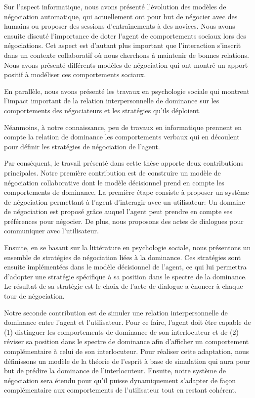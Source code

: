 			Sur l'aspect informatique, nous avons présenté l'évolution des modèles de négociation automatique, qui actuellement ont pour but de négocier avec des humains ou proposer des sessions d'entraînements à des novices. 			 
			Nous avons ensuite discuté l'importance de doter l'agent de comportements sociaux lors des négociations. Cet aspect est d'autant plus important que l'interaction s'inscrit dans un contexte collaboratif où nous cherchons à maintenir de bonnes relations. Nous avons présenté différents modèles de négociation qui ont montré un apport positif à modéliser ces comportements sociaux. 
			
			En parallèle, nous avons présenté les travaux en psychologie sociale qui montrent l'impact important de la relation interpersonnelle de dominance sur les comportements des négociateurs et les stratégies qu'ils déploient.
			
			Néanmoins, à notre connaissance, peu de travaux en informatique prennent en compte la relation de dominance les comportements verbaux qui en découlent pour définir les stratégies de négociation de l'agent.
			
			Par conséquent, le travail présenté dans cette thèse apporte deux contributions principales.
			Notre première contribution est de construire un modèle de négociation collaborative dont le modèle décisionnel prend en compte les comportements de dominance. 
			La première étape consiste à proposer un système de négociation permettant à l'agent d'interagir avec un utilisateur: Un domaine de négociation est proposé grâce auquel l'agent peut prendre en compte ses préférences pour négocier. De plus, nous proposons des actes de dialogues pour communiquer avec l'utilisateur.
			
			Ensuite, en se basant sur la littérature en psychologie sociale, nous présentons un ensemble de stratégies de négociation liées à la dominance.
			Ces stratégies sont ensuite implémentées dans le modèle décisionnel de l'agent, ce qui lui permettra d'adopter une stratégie spécifique à sa position dans le spectre de la dominance.  Le résultat de sa stratégie est le choix de l'acte de dialogue a énoncer à chaque tour de négociation.
			
			Notre seconde contribution est de simuler une relation interpersonnelle de dominance entre l'agent et l'utilisateur. Pour ce faire, l'agent doit être capable de (1) distinguer les comportements de dominance de son interlocuteur et  de (2) réviser sa position dans le spectre de dominance afin  d'afficher un comportement complémentaire à celui de son interlocuteur. 
			Pour réaliser cette adaptation, nous définissons un modèle de la théorie de l'esprit à base de simulation qui aura pour but de prédire la dominance de l'interlocuteur. Ensuite, notre système de négociation sera étendu pour qu'il puisse dynamiquement s'adapter de façon complémentaire aux comportements de l'utilisateur tout en restant cohérent. 
		
		
	
	  